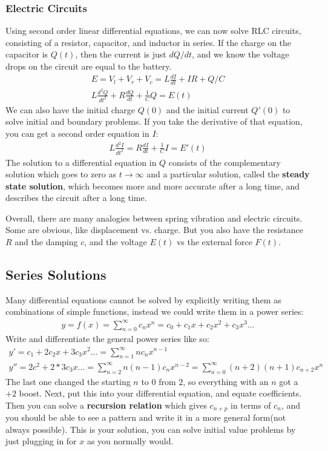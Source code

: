 \documentclass{article}
\begin{document}
\subsubsection{Electric Circuits}
Using second order linear differential equations, we can now solve RLC circuits, consisting of a resistor, capacitor, and inductor in series. If the charge on the capacitor is $Q(t)$, then the current is just $dQ/dt$, and we know the voltage drops on the circuit are equal to the battery.
\begin{gather*}
    E = V_l + V_r + V_c = L\frac{dI}{dt} + IR + Q/C\\
    L\frac{d^2Q}{dt^2} + R\frac{dQ}{dt} + \frac{1}{C}Q = E(t)
\end{gather*}
We can also have the initial charge $Q(0)$ and the initial current $Q'(0)$ to solve initial and boundary problems. If you take the derivative of that equation, you can get a second order equation in $I$:
\begin{gather*}
    L\frac{d^2I}{dt^2} = R\frac{dI}{dt} + \frac{1}{C}I = E'(t)
\end{gather*}
The solution to a differential equation in $Q$ consists of the complementary solution which goes to zero as $t \to \infty$ and a particular solution, called the \textbf{steady state solution}, which becomes more and more accurate after a long time, and describes the circuit after a long time.

Overall, there are many analogies between spring vibration and electric circuits. Some are obvious, like displacement vs. charge. But you also have the resistance $R$ and the damping $c$, and the voltage $E(t)$ vs the external force $F(t)$.
\subsection{Series Solutions}
Many differential equations cannot be solved by explicitly writing them as combinations of simple functions, instead we could write them in a power series:
\begin{gather*}
    y = f(x) = \sum_{n = 0}^\infty c_nx^n = c_0 + c_1x + c_2x^2 + c_3x^3...
\end{gather*}
Write and differentiate the general power series like so:
\begin{gather*}
    y' = c_1 + 2c_2x + 3c_3x^2... = \sum_{n=1}^\infty nc_nx^{n-1}\\
    y'' = 2c^2 + 2*3c_3x... = \sum_{n=2}^\infty n(n-1)c_nx^{n-2} = \sum_{n=0}^\infty (n+2)(n+1)c_{n+2}x^n
\end{gather*}
The last one changed the starting $n$ to $0$ from $2$, so everything with an $n$ got a $+2$ boost. Next, put this into your differential equation, and equate coefficients. Then you can solve a \textbf{recursion relation} which gives $c_{n+p}$ in terms of $c_n$, and you should be able to see a pattern and write it in a more general form(not always possible). This is your solution, you can solve initial value problems by just plugging in for $x$ as you normally would.
\end{document}
